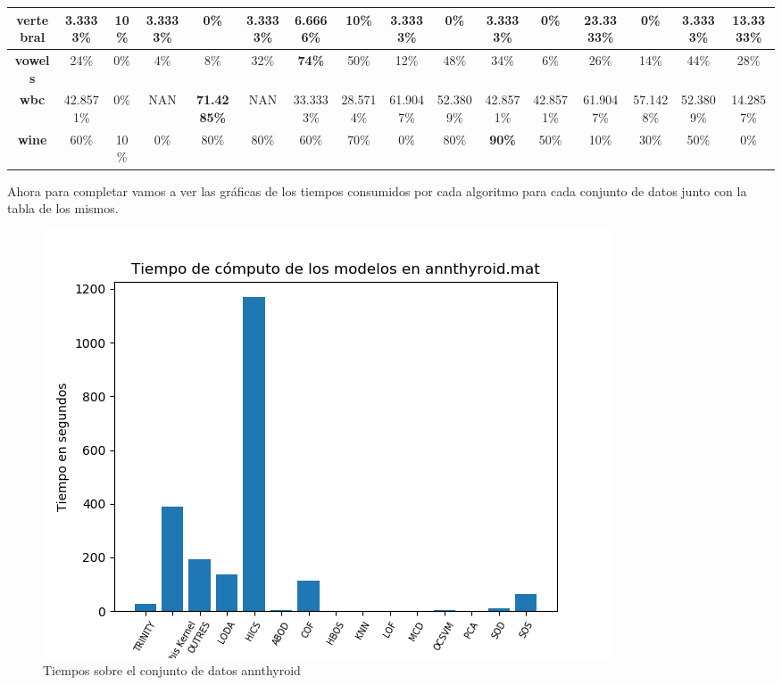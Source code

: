 \begin{table}[H]
{\begin{tabular}{|c|c|c|c|c|c|c|c|c|c|c|c|c|c|c|c|}
		\textbf{vertebral}        & 3.3333\%           & 10\%               & 3.3333\%        & 0\%                & 3.3333\%      & 6.6666\%           & 10\%               & 3.3333\%           & 0\%          & 3.3333\%           & 0\%                & \textbf{23.3333\%} & 0\%                & 3.3333\%           & 13.3333\%    \\ \hline
		\textbf{vowels}           & 24\%               & 0\%                & 4\%             & 8\%                & 32\%          & \textbf{74\%}      & 50\%               & 12\%               & 48\%         & 34\%               & 6\%                & 26\%               & 14\%               & 44\%               & 28\%         \\ \hline
		\textbf{wbc}              & 42.8571\%          & 0\%                & NAN             & \textbf{71.4285\%} & NAN           & 33.3333\%          & 28.5714\%          & 61.9047\%          & 52.3809\%    & 42.8571\%          & 42.8571\%          & 61.9047\%          & 57.1428\%          & 52.3809\%          & 14.2857\%    \\ \hline
		\textbf{wine}             & 60\%               & 10\%               & 0\%             & 80\%               & 80\%          & 60\%               & 70\%               & 0\%                & 80\%         & \textbf{90\%}      & 50\%               & 10\%               & 30\%               & 50\%               & 0\%          \\ \hline
	\end{tabular}
}
\end{table}

Ahora para completar vamos a ver las gráficas de los tiempos consumidos por cada algoritmo para cada conjunto de datos junto con la tabla de los mismos.

\begin{figure}[H]
	\centering
	\label{annthyroid_times}
	\includegraphics[scale=0.7]{imagenes/imgs-exp1/times/annthyroid}
	\caption{Tiempos sobre el conjunto de datos annthyroid}
\end{figure}

